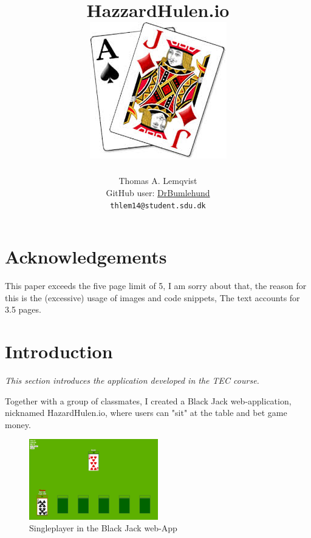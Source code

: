 \documentclass[a4paper]{article}
\title{HazzardHulen.io\\[4cm]
\includegraphics[width=.7\textwidth]{../blackjack}
\vfill}
\author{
  Thomas A. Lemqvist\\
  GitHub user: \href{https://github.com/DrBumlehund}{DrBumlehund}\\
  \texttt{thlem14@student.sdu.dk}
}
\begin{document}
\pagestyle{fancy}
\fancyhf{}

\maketitle
\thispagestyle{empty}
\newpage
\hspace{0cm}
\vfill
\tableofcontents

\vfill

\section*{Acknowledgements}
This paper exceeds the five page limit of 5, I am sorry about that, the reason for this is the (excessive) usage of images and code snippets, The text accounts for 3.5 pages.

\vfill
\newpage

\setcounter{page}{1}




\section{Introduction}
\textit{This section introduces the application developed in the TEC course.}

Together with a group of classmates, I created a Black Jack web-application, nicknamed HazardHulen.io, where users can "sit" at the table and bet game money.

\begin{figure}[H]
  \centering
  \includegraphics[width=0.5\textwidth]{images/singleplayer}	
  \caption{Singleplayer in the Black Jack web-App}
  \label{sp:bj}
\end{figure}
\end{document}
